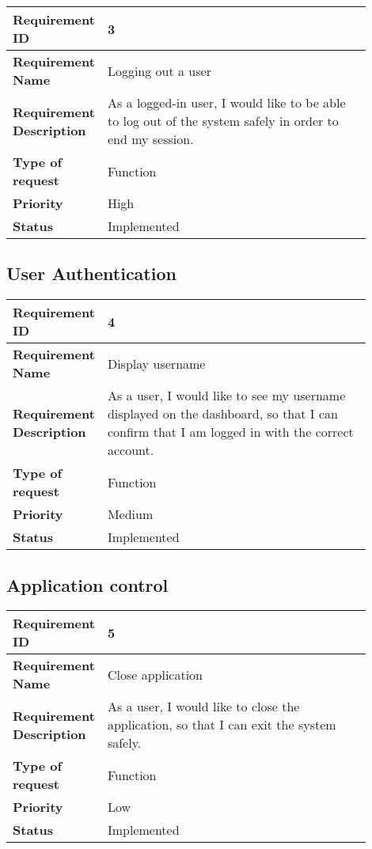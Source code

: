 \begin{table}[htbp]
  \centering
\begin{tabular}{|m{0.15\linewidth}|m{0.75\linewidth}|}
    \hline
    \textbf{Requirement ID} & 3 \\
    \hline
    \textbf{Requirement Name} &  Logging out a user \\
    \hline
    \textbf{Requirement Description} & As a logged-in user, I would like to be able to log out of the system safely in order to end my session. \\
    \hline
    \textbf{Type of request} & Function \\
    \hline
    \textbf{Priority} & High \\
    \hline
    \textbf{Status} & Implemented \\
    \hline
  \end{tabular}
\end{table}

\newpage
\subsection{User Authentication}
\begin{table}[htbp]
\centering
\begin{tabular}{|m{0.15\linewidth}|m{0.75\linewidth}|}
\hline
\textbf{Requirement ID} & 4 \\
\hline
\textbf{Requirement Name} & Display username \\
\hline
\textbf{Requirement Description} & As a user, I would like to see my username displayed on the dashboard, so that I can confirm that I am logged in with the correct account. \\
\hline
\textbf{Type of request} & Function \\
\hline
\textbf{Priority} & Medium \\
\hline
\textbf{Status} & Implemented \\
\hline
\end{tabular}
\end{table}

\subsection{Application control}
\begin{table}[htbp]
\centering
\begin{tabular}{|m{0.15\linewidth}|m{0.75\linewidth}|}
\hline
\textbf{Requirement ID} & 5 \\
\hline
\textbf{Requirement Name} & Close application \\
\hline
\textbf{Requirement Description} & As a user, I would like to close the application, so that I can exit the system safely. \\
\hline
\textbf{Type of request} & Function \\
\hline
\textbf{Priority} & Low \\
\hline
\textbf{Status} & Implemented \\
\hline
\end{tabular}
\end{table}

